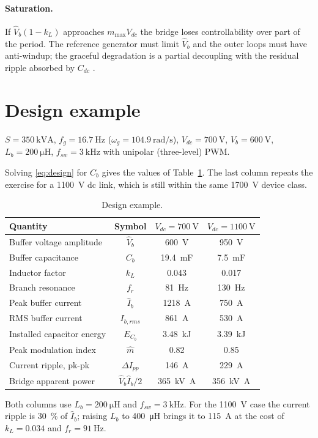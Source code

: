 \documentclass[11pt,a4paper]{article}
\begin{document}
\paragraph{Saturation.} If $\hat V_b(1-k_L)$ approaches $m_{\max}V_{dc}$ the
bridge loses controllability over part of the period. The reference generator
must limit $\hat V_b$ and the outer loops must have anti-windup; the graceful
degradation is a partial decoupling with the residual ripple absorbed by
$C_{dc}$ \cite{neumayr2021partial}.

\section{Design example}

$S=\SI{350}{\kilo\volt\ampere}$, $f_g=\SI{16.7}{\hertz}$
($\omega_g=\SI{104.9}{\radian\per\second}$), $V_{dc}=\SI{700}{\volt}$,
$\hat V_b=\SI{600}{\volt}$, $L_b=\SI{200}{\micro\henry}$,
$f_{sw}=\SI{3}{\kilo\hertz}$ with unipolar (three-level) PWM.

Solving \eqref{eq:design} for $C_b$ gives the values of
Table~\ref{tab:design}. The last column repeats the exercise for a
\SI{1100}{\volt} dc link, which is still within the same
\SI{1700}{\volt} device class.

\begin{table}[htb]
\centering
\caption{Design example.}
\label{tab:design}
\begin{tabular}{lccc}
\toprule
Quantity & Symbol & $V_{dc}=\SI{700}{\volt}$ & $V_{dc}=\SI{1100}{\volt}$ \\
\midrule
Buffer voltage amplitude & $\hat V_b$ & \SI{600}{\volt} & \SI{950}{\volt} \\
Buffer capacitance & $C_b$ & \SI{19.4}{\milli\farad} & \SI{7.5}{\milli\farad} \\
Inductor factor & $k_L$ & 0.043 & 0.017 \\
Branch resonance & $f_r$ & \SI{81}{\hertz} & \SI{130}{\hertz} \\
Peak buffer current & $\hat I_b$ & \SI{1218}{\ampere} & \SI{750}{\ampere} \\
RMS buffer current & $I_{b,rms}$ & \SI{861}{\ampere} & \SI{530}{\ampere} \\
Installed capacitor energy & $E_{C_b}$ & \SI{3.48}{\kilo\joule} & \SI{3.39}{\kilo\joule} \\
Peak modulation index & $\hat m$ & 0.82 & 0.85 \\
Current ripple, pk-pk & $\Delta I_{pp}$ & \SI{146}{\ampere} & \SI{229}{\ampere} \\
Bridge apparent power & $\hat V_b\hat I_b/2$ & \SI{365}{\kilo\volt\ampere} & \SI{356}{\kilo\volt\ampere} \\
\bottomrule
\end{tabular}

\vspace{2mm}
{\footnotesize Both columns use $L_b=\SI{200}{\micro\henry}$ and
$f_{sw}=\SI{3}{\kilo\hertz}$. For the \SI{1100}{\volt} case the current
ripple is \SI{30}{\percent} of $\hat I_b$; raising $L_b$ to
\SI{400}{\micro\henry} brings it to \SI{115}{\ampere} at the cost of
$k_L=0.034$ and $f_r=\SI{91}{\hertz}$.}
\end{table}
\end{document}
